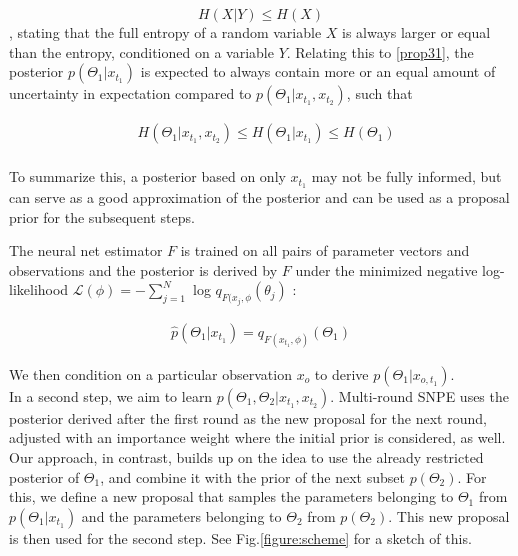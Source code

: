 \documentclass[12pt]{extreport}
\begin{document}
\begin{equation}
\label{prop33}
 H(X|Y) \leq H(X) 
\end{equation}, stating that the full entropy of a random variable $X$ is always larger or equal than the entropy, conditioned on a variable $Y$. Relating this to \ref{prop31}, the posterior $p(\Theta_1|x_{t_1})$ is expected to always contain more or an equal amount of uncertainty in expectation compared to $p(\Theta_1|x_{t_1}, x_{t_2})$, such that 

\begin{equation}
\begin{aligned}
    & H(\Theta_1|x_{t_1}, x_{t_2}) \leq H(\Theta_1|x_{t_1}) \leq H(\Theta_1)\\
\end{aligned}
\end{equation}

To summarize this, a posterior based on only $x_{t_1}$ may not be fully informed, but can serve as a good approximation of the posterior and can be used as a proposal prior for the subsequent steps. 

The neural net estimator $F$ is trained on all pairs of parameter vectors and observations and the posterior is derived by $F$ under the minimized negative log-likelihood $\mathcal{L}(\phi) = - \sum_{j=1}^{N}$ log $q_{F(x_j, \phi}(\theta_j)$ \citep{greenberg_automatic_2019}:

\begin{equation}
\label{prop35}
\begin{aligned}
    \hat{p}(\Theta_1|x_{t_1}) = q_{F(x_{t_1},\phi)}(\Theta_1)
\end{aligned}
\end{equation}

We then condition on a particular observation $x_o$ to derive $p(\Theta_1|x_{o,{t_1}})$.\\



In a second step, we aim to learn $p(\Theta_1, \Theta_2|x_{t_1}, x_{t_2})$. Multi-round SNPE \citep{greenberg_automatic_2019} uses the posterior derived after the first round as the new proposal for the next round, adjusted with an importance weight where the initial prior is considered, as well. 
Our approach, in contrast, builds up on the idea to use the already restricted posterior of $\Theta_1$, and combine it with the prior of the next subset $p(\Theta_2)$. For this, we define a new proposal that samples the parameters belonging to $\Theta_1$ from $p(\Theta_1|x_{t_1})$ and the parameters belonging to $\Theta_2$ from $p(\Theta_2)$. This new proposal is then used for the second step. See Fig.\ref{figure:scheme} for a sketch of this. 
\end{document}

